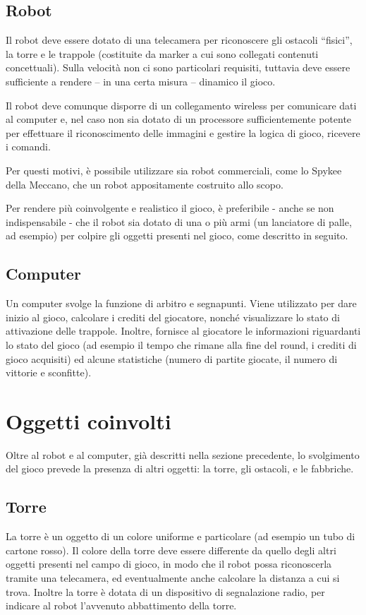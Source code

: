 \subsection*{Robot}
Il robot deve essere dotato di una telecamera per riconoscere gli ostacoli “fisici”, la torre e le trappole (costituite da marker a cui sono collegati contenuti concettuali). Sulla velocità non ci sono particolari requisiti, tuttavia deve essere sufficiente a rendere – in una certa misura – dinamico il gioco.

Il robot deve comunque disporre di un collegamento wireless per comunicare dati al computer e, nel caso non sia dotato di un processore sufficientemente potente per effettuare il riconoscimento delle immagini e gestire la logica di gioco, ricevere i comandi.

Per questi motivi, è possibile utilizzare sia robot commerciali, come lo Spykee della Meccano, che un robot appositamente costruito allo scopo.

Per rendere più coinvolgente e realistico il gioco, è preferibile - anche se non indispensabile - che il robot sia dotato di una o più armi (un lanciatore di palle, ad esempio) per colpire gli oggetti presenti nel gioco, come descritto in seguito.

\subsection*{Computer} Un computer svolge la funzione di arbitro e segnapunti. Viene utilizzato per dare inizio al gioco, calcolare i crediti del giocatore, nonché visualizzare lo stato di attivazione delle trappole. Inoltre, fornisce al giocatore le informazioni riguardanti lo stato del gioco (ad esempio il tempo che rimane alla fine del round, i crediti di gioco acquisiti) ed alcune statistiche (numero di partite giocate, il numero di vittorie e sconfitte).

\section{Oggetti coinvolti}
Oltre al robot e al computer, già descritti nella sezione precedente, lo svolgimento del gioco prevede la presenza di altri oggetti: la torre, gli ostacoli, e le fabbriche.

\subsection*{Torre} La torre è un oggetto di un colore uniforme e particolare (ad esempio un tubo di cartone rosso). Il colore della torre deve essere differente da quello degli altri oggetti presenti nel campo di gioco, in modo che il robot possa riconoscerla tramite una telecamera, ed eventualmente anche calcolare la distanza a cui si trova. Inoltre la torre è dotata di un dispositivo di segnalazione radio, per indicare al robot l'avvenuto abbattimento della torre.

